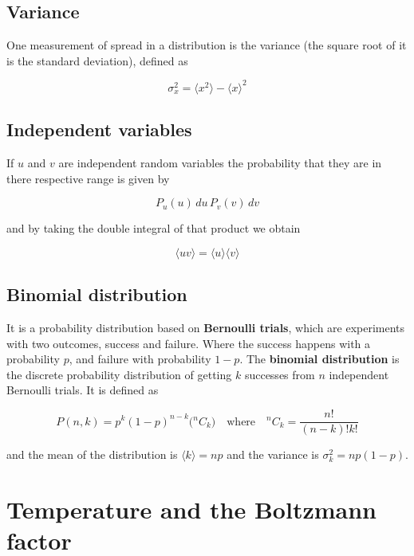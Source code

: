 \documentclass[a4paper]{article}
\begin{document}
\subsection{Variance}

One measurement of spread in a distribution is the variance (the square root of it is the standard deviation), defined as

\begin{equation}
	\sigma_x^2=\langle x^2 \rangle - \langle x \rangle^2
\end{equation}

\subsection{Independent variables}

If $u$ and $v$ are independent random variables the probability that they are in there respective range is given by

\begin{equation}
	P_u(u)\,du\,P_v(v)\,dv
\end{equation}

and by taking the double integral of that product we obtain

\begin{equation}
	\langle uv \rangle = \langle u \rangle \langle v \rangle
\end{equation}


\subsection{Binomial distribution}

It is a probability distribution based on \textbf{Bernoulli trials}, which are experiments with two outcomes, success and failure. Where the success happens with a probability $p$, and failure with probability $1-p$. The \textbf{binomial distribution} is the discrete probability distribution of getting $k$ successes from $n$ independent Bernoulli trials. It is defined as

\begin{equation}
	P(n, k) = p^k(1-p)^{n-k}\big({}^nC_k\big)\quad\text{where}\quad {}^nC_k=\frac{n!}{(n-k)!k!}
\end{equation}

and the mean of the distribution is $\langle k \rangle=np$ and the variance is $\sigma_k^2=np(1-p)$.

\section{Temperature and the Boltzmann factor}
\end{document}
